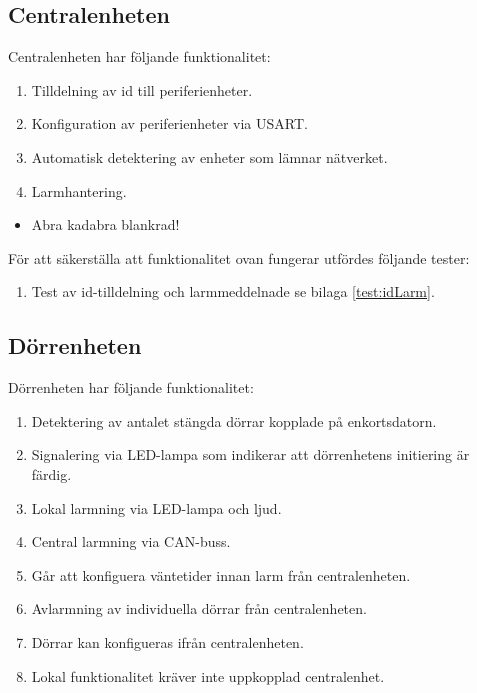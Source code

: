 \documentclass{article}
\begin{document}
 \subsection{Centralenheten}
 Centralenheten har följande funktionalitet:
 \begin{enumerate}
     \item Tilldelning av id till periferienheter.
     \item Konfiguration av periferienheter via USART.
     \item Automatisk detektering av enheter som lämnar nätverket.
     \item Larmhantering.
 \end{enumerate}

 \begin{itemize}
\color{white}
\item Abra kadabra blankrad!
\end{itemize}

 För att säkerställa att funktionalitet ovan fungerar utfördes följande tester:
 \begin{enumerate}
     \item Test av id-tilldelning och larmmeddelnade se bilaga \ref{test:idLarm}.
 \end{enumerate}
 
 \subsection{Dörrenheten}
 Dörrenheten har följande funktionalitet:
 \begin{enumerate}
     \item Detektering av antalet stängda dörrar kopplade på enkortsdatorn.
     \item Signalering via LED-lampa som indikerar att dörrenhetens initiering är färdig.
     \item Lokal larmning via LED-lampa och ljud.
     \item Central larmning via CAN-buss.
     \item Går att konfiguera väntetider innan larm från centralenheten.
     \item Avlarmning av individuella dörrar från centralenheten.
     \item Dörrar kan konfigueras ifrån centralenheten.
     \item Lokal funktionalitet kräver inte uppkopplad centralenhet.
 \end{enumerate}
\end{document}
